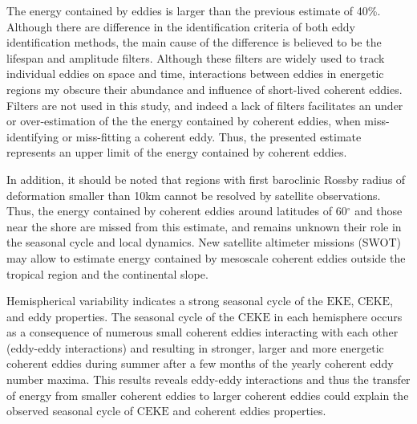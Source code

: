 \documentclass[draft,linenumbers]{agujournal2019}
\newcommand{\EKE}{\textrm{EKE}}
\newcommand{\CEKE}{\textrm{CEKE}}
\begin{document}
	The energy contained by eddies is larger than the previous estimate of 40\%.
	Although there are difference in the identification criteria of both eddy identification methods, the main cause of the difference is believed to be the lifespan and amplitude filters. 
	Although these filters are widely used to track individual eddies on space and time, interactions between eddies in energetic regions my obscure their abundance and influence of short-lived coherent eddies. 
	Filters are not used in this study, and indeed a lack of filters facilitates an under or over-estimation of the the energy contained by coherent eddies, when miss-identifying or miss-fitting a coherent eddy. 
	Thus, the presented estimate represents an upper limit of the energy contained by coherent eddies. 

	In addition, it should be noted that regions with first baroclinic Rossby radius of deformation smaller than 10km cannot be resolved by satellite observations. 
	Thus, the energy contained by coherent eddies around latitudes of 60$^\circ$ and those near the shore are missed from this estimate, and remains unknown their role in the seasonal cycle and local dynamics. New satellite altimeter missions (SWOT) may allow to estimate energy contained by mesoscale coherent eddies outside the tropical region and the continental slope.

	Hemispherical variability indicates a strong seasonal cycle of the $\EKE$, $\CEKE$, and eddy properties. 
	The seasonal cycle of the $\CEKE$ in each hemisphere occurs as a consequence of numerous small coherent eddies interacting with each other (eddy-eddy interactions) and resulting in stronger, larger and more energetic coherent eddies during summer after a few months of the yearly coherent eddy number maxima.
	This results reveals eddy-eddy interactions and thus the transfer of energy from smaller coherent eddies to larger coherent eddies could explain the observed seasonal cycle of $\CEKE$ and coherent eddies properties.
	
\end{document}
